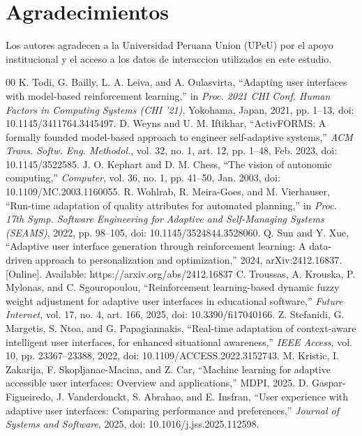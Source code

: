 \documentclass[conference]{IEEEtran}
\begin{document}
\section*{Agradecimientos}
Los autores agradecen a la Universidad Peruana Union (UPeU) por el apoyo institucional y el acceso a los datos de interaccion utilizados en este estudio.

\begin{thebibliography}{00}
 K. Todi, G. Bailly, L. A. Leiva, and A. Oulasvirta, ``Adapting user interfaces with model-based reinforcement learning,'' in \textit{Proc. 2021 CHI Conf. Human Factors in Computing Systems (CHI '21)}, Yokohama, Japan, 2021, pp. 1--13, doi: 10.1145/3411764.3445497.
 D. Weyns and U. M. Iftikhar, ``ActivFORMS: A formally founded model-based approach to engineer self-adaptive systems,'' \textit{ACM Trans. Softw. Eng. Methodol.}, vol. 32, no. 1, art. 12, pp. 1--48, Feb. 2023, doi: 10.1145/3522585.
 J. O. Kephart and D. M. Chess, ``The vision of autonomic computing,'' \textit{Computer}, vol. 36, no. 1, pp. 41--50, Jan. 2003, doi: 10.1109/MC.2003.1160055.
 R. Wohlrab, R. Meira-Goes, and M. Vierhauser, ``Run-time adaptation of quality attributes for automated planning,'' in \textit{Proc. 17th Symp. Software Engineering for Adaptive and Self-Managing Systems (SEAMS)}, 2022, pp. 98--105, doi: 10.1145/3524844.3528060.
 Q. Sun and Y. Xue, ``Adaptive user interface generation through reinforcement learning: A data-driven approach to personalization and optimization,'' 2024, arXiv:2412.16837. [Online]. Available: https://arxiv.org/abs/2412.16837
 C. Troussas, A. Krouska, P. Mylonas, and C. Sgouropoulou, ``Reinforcement learning-based dynamic fuzzy weight adjustment for adaptive user interfaces in educational software,'' \textit{Future Internet}, vol. 17, no. 4, art. 166, 2025, doi: 10.3390/fi17040166.
 Z. Stefanidi, G. Margetis, S. Ntoa, and G. Papagiannakis, ``Real-time adaptation of context-aware intelligent user interfaces, for enhanced situational awareness,'' \textit{IEEE Access}, vol. 10, pp. 23367--23388, 2022, doi: 10.1109/ACCESS.2022.3152743.
 M. Kristic, I. Zakarija, F. Skopljanac-Macina, and Z. Car, ``Machine learning for adaptive accessible user interfaces: Overview and applications,'' MDPI, 2025.
 D. Gaspar-Figueiredo, J. Vanderdonckt, S. Abrahao, and E. Insfran, ``User experience with adaptive user interfaces: Comparing performance and preferences,'' \textit{Journal of Systems and Software}, 2025, doi: 10.1016/j.jss.2025.112598.

\end{thebibliography}
\end{document}
